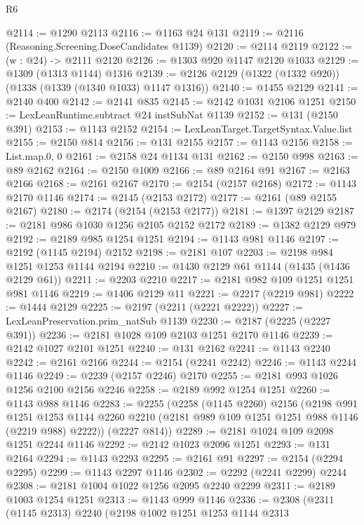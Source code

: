 \begin{lexlean}{R6}
\begin{coremodule}
@2114 := @1290 @2113
@2116 := @1163 @24 @131
@2119 := @2116 (Reasoning.Screening.DoseCandidates @1139)
@2120 := @2114 @2119
@2122 := (w : @24) -> @2111 @2120
@2126 := @1303 @920 @1147 @2120 @1033
@2129 := @1309 (@1313 @1144) @1316
@2139 := @2126 @2129 (@1322 (@1332 @920)) (@1338 (@1339 (@1340 @1033) @1147 @1316))
@2140 := @1455 @2129
@2141 := @2140 @400
@2142 := @2141 @835
@2145 := @2142 @1031 @2106 @1251
@2150 := LexLeanRuntime.subtract @24 instSubNat @1139
@2152 := @131 (@2150 @391)
@2153 := @1143 @2152
@2154 := LexLeanTarget.TargetSyntax.Value.list
@2155 := @2150 @814
@2156 := @131 @2155
@2157 := @1143 @2156
@2158 := List.map.{0, 0}
@2161 := @2158 @24 @1134 @131
@2162 := @2150 @998
@2163 := @89 @2162
@2164 := @2150 @1009
@2166 := @89 @2164 @91
@2167 := @2163 @2166
@2168 := @2161 @2167
@2170 := @2154 (@2157 @2168)
@2172 := @1143 @2170 @1146
@2174 := @2145 (@2153 @2172)
@2177 := @2161 (@89 @2155 @2167)
@2180 := @2174 (@2154 (@2153 @2177))
@2181 := @1397 @2129
@2187 := @2181 @986 @1030 @1256 @2105 @2152 @2172
@2189 := @1382 @2129 @979
@2192 := @2189 @985 @1254 @1251
@2194 := @1143 @981 @1146
@2197 := @2192 (@1145 @2194) @2152
@2198 := @2181 @107
@2203 := @2198 @984 @1251 @1253 @1144 @2194
@2210 := @1430 @2129 @61 @1144 (@1435 (@1436 @2129 @61))
@2211 := @2203 @2210
@2217 := @2181 @982 @109 @1251 @1251 @981 @1146
@2219 := @1406 @2129 @11
@2221 := @2217 (@2219 @981)
@2222 := @1444 @2129
@2225 := @2197 (@2211 (@2221 @2222))
@2227 := LexLeanPreservation.prim_natSub @1139
@2230 := @2187 (@2225 (@2227 @391))
@2236 := @2181 @1028 @109 @2103 @1251 @2170 @1146
@2239 := @2142 @1027 @2101 @1251
@2240 := @131 @2162
@2241 := @1143 @2240
@2242 := @2161 @2166
@2244 := @2154 (@2241 @2242)
@2246 := @1143 @2244 @1146
@2249 := @2239 (@2157 @2246) @2170
@2255 := @2181 @993 @1026 @1256 @2100 @2156 @2246
@2258 := @2189 @992 @1254 @1251
@2260 := @1143 @988 @1146
@2283 := @2255
    (@2258
      (@1145 @2260)
      @2156
      (@2198
        @991
        @1251
        @1253
        @1144
        @2260
        @2210
        (@2181 @989 @109 @1251 @1251 @988 @1146 (@2219 @988) @2222))
      (@2227 @814))
@2289 := @2181 @1024 @109 @2098 @1251 @2244 @1146
@2292 := @2142 @1023 @2096 @1251
@2293 := @131 @2164
@2294 := @1143 @2293
@2295 := @2161 @91
@2297 := @2154 (@2294 @2295)
@2299 := @1143 @2297 @1146
@2302 := @2292 (@2241 @2299) @2244
@2308 := @2181 @1004 @1022 @1256 @2095 @2240 @2299
@2311 := @2189 @1003 @1254 @1251
@2313 := @1143 @999 @1146
@2336 := @2308
    (@2311
      (@1145 @2313)
      @2240
      (@2198
        @1002
        @1251
        @1253
        @1144
        @2313

\end{coremodule}
\end{lexlean}

